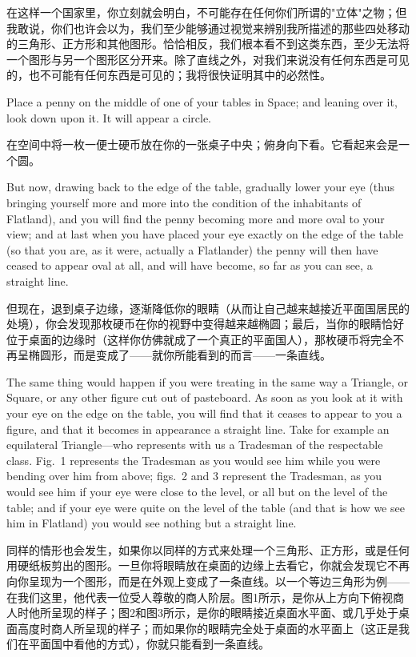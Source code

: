 \documentclass[12pt,UTF8]{ctexbook}
\begin{document}
在这样一个国家里，你立刻就会明白，不可能存在任何你们所谓的"立体"之物；但我敢说，你们也许会以为，我们至少能够通过视觉来辨别我所描述的那些四处移动的三角形、正方形和其他图形。恰恰相反，我们根本看不到这类东西，至少无法将一个图形与另一个图形区分开来。除了直线之外，对我们来说没有任何东西是可见的，也不可能有任何东西是可见的；我将很快证明其中的必然性。

Place a penny on the middle of one of your tables in Space; and leaning over it, look down upon it. It will appear a circle.

在空间中将一枚一便士硬币放在你的一张桌子中央；俯身向下看。它看起来会是一个圆。

But now, drawing back to the edge of the table, gradually lower your eye (thus bringing yourself more and more into the condition of the inhabitants of Flatland), and you will find the penny becoming more and more oval to your view; and at last when you have placed your eye exactly on the edge of the table (so that you are, as it were, actually a Flatlander) the penny will then have ceased to appear oval at all, and will have become, so far as you can see, a straight line.

但现在，退到桌子边缘，逐渐降低你的眼睛（从而让自己越来越接近平面国居民的处境），你会发现那枚硬币在你的视野中变得越来越椭圆；最后，当你的眼睛恰好位于桌面的边缘时（这样你仿佛就成了一个真正的平面国人），那枚硬币将完全不再呈椭圆形，而是变成了——就你所能看到的而言——一条直线。

The same thing would happen if you were treating in the same way a Triangle, or Square, or any other figure cut out of pasteboard. As soon as you look at it with your eye on the edge on the table, you will find that it ceases to appear to you a figure, and that it becomes in appearance a straight line. Take for example an equilateral Triangle---who represents with us a Tradesman of the respectable class. Fig.\ 1 represents the Tradesman as you would see him while you were bending over him from above; figs.\ 2 and 3 represent the Tradesman, as you would see him if your eye were close to the level, or all but on the level of the table; and if your eye were quite on the level of the table (and that is how we see him in Flatland) you would see nothing but a straight line.

同样的情形也会发生，如果你以同样的方式来处理一个三角形、正方形，或是任何用硬纸板剪出的图形。一旦你将眼睛放在桌面的边缘上去看它，你就会发现它不再向你呈现为一个图形，而是在外观上变成了一条直线。以一个等边三角形为例——在我们这里，他代表一位受人尊敬的商人阶层。图1所示，是你从上方向下俯视商人时他所呈现的样子；图2和图3所示，是你的眼睛接近桌面水平面、或几乎处于桌面高度时商人所呈现的样子；而如果你的眼睛完全处于桌面的水平面上（这正是我们在平面国中看他的方式），你就只能看到一条直线。
\end{document}
